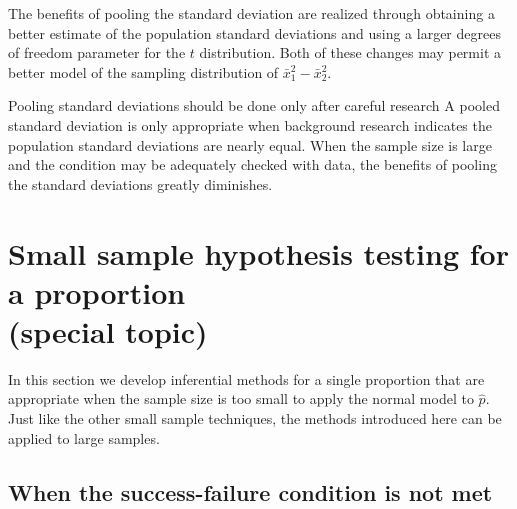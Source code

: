 The benefits of pooling the standard deviation are realized through obtaining a better estimate of the population standard deviations and using a larger degrees of freedom parameter for the $t$ distribution. Both of these changes may permit a better model of the sampling distribution of $\bar{x}_1^2 - \bar{x}_2^2$.

\begin{caution}
{Pooling standard deviations should be done only after careful research}
{A pooled standard deviation is only appropriate when background research indicates the population standard deviations are nearly equal. When the sample size is large and the condition may be adequately checked with data, the benefits of pooling the standard deviations greatly diminishes.}
\end{caution}







\section[Small sample hypothesis testing for a proportion (special topic)]{Small sample hypothesis testing for a proportion\\(special topic)}
\label{smallSampleHTForProportion}

In this section we develop inferential methods for a single proportion that are appropriate when the sample size is too small to apply the normal model to $\hat{p}$. Just like the other small sample techniques, the methods introduced here can be applied to large samples.

\subsection{When the success-failure condition is not met}

